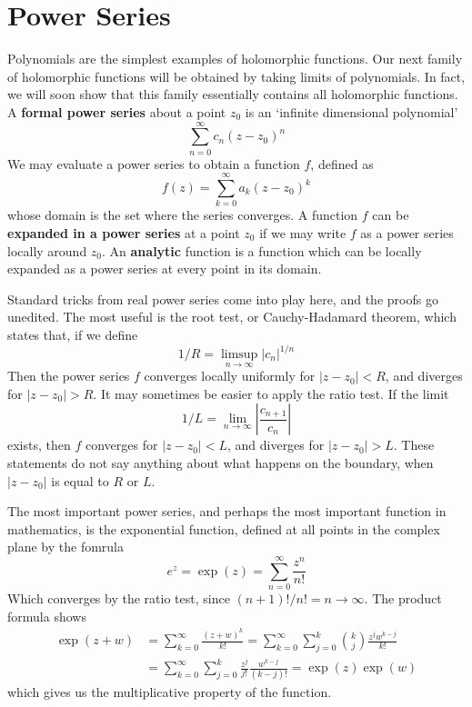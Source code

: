 \section{Power Series}

Polynomials are the simplest examples of holomorphic functions. Our next family of holomorphic functions will be obtained by taking limits of polynomials. In fact, we will soon show that this family essentially contains all holomorphic functions. A {\bf formal power series} about a point $z_0$ is an `infinite dimensional polynomial'
%
\[ \sum_{n = 0}^\infty c_n (z - z_0)^n \]
%
We may evaluate a power series to obtain a function $f$, defined as
%
\[ f(z) = \sum_{k = 0}^\infty a_k (z - z_0)^k \]
%
whose domain is the set where the series converges. A function $f$ can be {\bf expanded in a power series} at a point $z_0$ if we may write $f$ as a power series locally around $z_0$. An {\bf analytic} function is a function which can be locally expanded as a power series at every point in its domain.

Standard tricks from real power series come into play here, and the proofs go unedited. The most useful is the root test, or Cauchy-Hadamard theorem, which states that, if we define
%
\[ 1/R = \limsup_{n \to \infty} |c_n|^{1/n} \]
%
Then the power series $f$ converges locally uniformly for $|z - z_0| < R$, and diverges for $|z - z_0| > R$. It may sometimes be easier to apply the ratio test. If the limit
%
\[ 1/L = \lim_{n \to \infty} \left| \frac{c_{n+1}}{c_n} \right| \]
%
exists, then $f$ converges for $|z - z_0| < L$, and diverges for $|z - z_0| > L$. These statements do not say anything about what happens on the boundary, when $|z - z_0|$ is equal to $R$ or $L$.

\begin{example}
    The most important power series, and perhaps the most important function in mathematics, is the exponential function, defined at all points in the complex plane by the fomrula
    \[ e^z = \exp(z) = \sum_{n = 0}^\infty \frac{z^n}{n!} \]
    Which converges by the ratio test, since $(n+1)!/n! = n \to \infty$. The product formula shows
    \begin{align*}
    \exp(z + w) &= \sum_{k = 0}^\infty \frac{(z + w)^k}{k!} = \sum_{k = 0}^\infty \sum_{j = 0}^k \binom{k}{j} \frac{z^j w^{k-j}}{k!}\\
    &= \sum_{k = 0}^\infty \sum_{j = 0}^k \frac{z^j}{j!} \frac{w^{k-j}}{(k - j)!} = \exp(z) \exp(w)
    \end{align*}
    which gives us the multiplicative property of the function.
\end{example}

